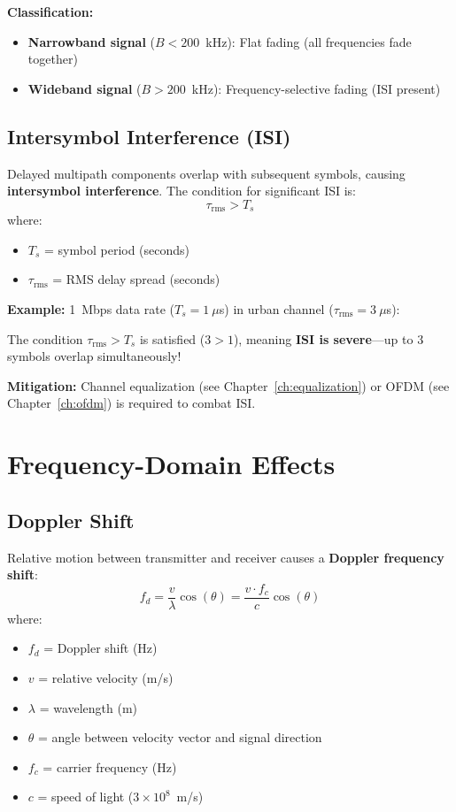 \textbf{Classification:}
\begin{itemize}
\item \textbf{Narrowband signal} ($B < 200$~kHz): Flat fading (all frequencies fade together)
\item \textbf{Wideband signal} ($B > 200$~kHz): Frequency-selective fading (ISI present)
\end{itemize}

\subsection{Intersymbol Interference (ISI)}

Delayed multipath components overlap with subsequent symbols, causing \textbf{intersymbol interference}. The condition for significant ISI is:
\begin{equation}
\tau_{\text{rms}} > T_s
\end{equation}
where:
\begin{itemize}
\item $T_s$ = symbol period (seconds)
\item $\tau_{\text{rms}}$ = RMS delay spread (seconds)
\end{itemize}

\textbf{Example:} 1~Mbps data rate ($T_s = 1~\mu$s) in urban channel ($\tau_{\text{rms}} = 3~\mu$s):

The condition $\tau_{\text{rms}} > T_s$ is satisfied ($3 > 1$), meaning \textbf{ISI is severe}---up to 3 symbols overlap simultaneously!

\textbf{Mitigation:} Channel equalization (see Chapter~\ref{ch:equalization}) or OFDM (see Chapter~\ref{ch:ofdm}) is required to combat ISI.

\section{Frequency-Domain Effects}

\subsection{Doppler Shift}

Relative motion between transmitter and receiver causes a \textbf{Doppler frequency shift}:
\begin{equation}
f_d = \frac{v}{\lambda} \cos(\theta) = \frac{v \cdot f_c}{c} \cos(\theta)
\end{equation}
where:
\begin{itemize}
\item $f_d$ = Doppler shift (Hz)
\item $v$ = relative velocity (m/s)
\item $\lambda$ = wavelength (m)
\item $\theta$ = angle between velocity vector and signal direction
\item $f_c$ = carrier frequency (Hz)
\item $c$ = speed of light ($3 \times 10^8$~m/s)
\end{itemize}

